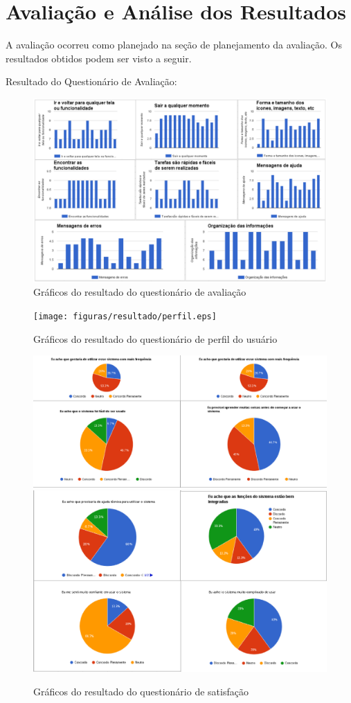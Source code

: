 \chapter[Avaliação e Análise dos Resultados]{Avaliação e Análise dos Resultados}

A avaliação ocorreu como planejado na seção de planejamento da avaliação. Os resultados obtidos podem ser visto a seguir.

Resultado do Questionário de Avaliação:

\begin{figure}[h]
	\centering
	\includegraphics[scale=0.5]{figuras/resultado/Questionario_avaliacao_resultados.eps}
	\caption{Gráficos do resultado do questionário de avaliação}
\end{figure}

\begin{figure}[h]
	\centering
	\texttt{[image: figuras/resultado/perfil.eps]}
	\caption{Gráficos do resultado do questionário de perfil do usuário}
\end{figure}


\begin{figure}[h]
	\centering
	\includegraphics[scale=0.5]{figuras/resultado/satisfacao1.eps}
	\includegraphics[scale=0.5]{figuras/resultado/satisfacao2.eps}
	\caption{Gráficos do resultado do questionário de satisfação}
\end{figure}
